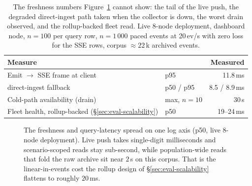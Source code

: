 \begin{table}[h]
\centering
\small
\begin{tabular}{@{}llr@{}}
\toprule
\textbf{Measure} & & \textbf{Measured} \\
\midrule
Emit $\to$ SSE frame at client   & p95          & 11.8\,ms \\
\quad direct-ingest fallback     & p50 / p95    & 8.5 / 8.9\,ms \\
Cold-path availability (drain)   & max, $n{=}10$ & 30\,s \\
Fleet health, rollup-backed (\S\ref{sec:eval-scalability}) & p50 & 19--24\,ms \\
\bottomrule
\end{tabular}
\caption[Freshness and query latency: tails and degraded paths]{The
freshness numbers Figure~\ref{fig:query-latency} cannot show: the tail of
the live push, the degraded direct-ingest path taken when the collector is
down, the worst drain observed, and the rollup-backed fleet read.
Live 8-node deployment, dashboard node, $n{=}100$ per query row,
$n{=}1\,000$ paced events at 20\,ev/s with zero loss for the SSE rows,
corpus ${\approx}22$\,k archived events.}
\label{tab:freshness}
\end{table}

\begin{figure}[t]
  \centering
  
  \caption[Freshness and query latency, measured]{The freshness and query-latency spread on one log axis (p50,
  live 8-node deployment). Live push takes single-digit milliseconds and
  scenario-scoped reads stay sub-second, while population-wide reads
  that fold the raw archive sit near $2$\,s on this corpus. That is the
  linear-in-events cost the rollup design of
  \S\ref{sec:eval-scalability} flattens to roughly $20$\,ms.}
  \label{fig:query-latency}
\end{figure}


